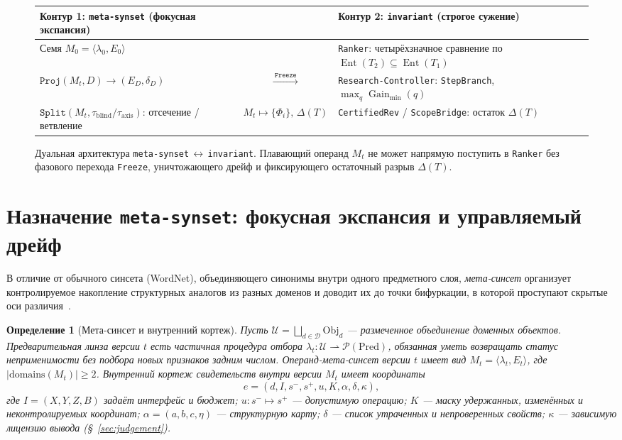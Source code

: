 \documentclass[11pt,a4paper]{article}
\theoremstyle{preprintthm}
\theoremstyle{preprintdef}
\newtheorem{definition}[theorem]{Определение}
\newcommand{\calD}{\mathcal{D}}
\newcommand{\calU}{\mathcal{U}}
\newcommand{\Gain}{\operatorname{Gain}}
\newcommand{\Ent}{\operatorname{Ent}}
\begin{document}
\begin{figure}[!htbp]
\centering
\begingroup\footnotesize
\begin{tabularx}{\linewidth}{@{}XcX@{}}
\toprule
Контур 1: \texttt{meta-synset} (фокусная экспансия) && Контур 2: \texttt{invariant} (строгое сужение)\\
\midrule
Семя $M_0=\langle\lambda_0,E_0\rangle$ && \texttt{Ranker}: четырёхзначное сравнение по $\Ent(T_2)\subseteq\Ent(T_1)$\\
$\texttt{Proj}(M_t,D)\to(E_D,\delta_D)$ &
$\xrightarrow{\ \texttt{Freeze}\ }$ &
\texttt{Research-Controller}: \texttt{StepBranch}, $\max_q\Gain_{\min}(q)$\\
$\texttt{Split}(M_t,\tau_{\mathrm{blind}}/\tau_{\mathrm{axis}})$: отсечение / ветвление &
$M_t\longmapsto\{\Phi_i\},\,\Delta(T)$ &
\texttt{CertifiedRev} / \texttt{ScopeBridge}: остаток $\Delta(T)$\\
\bottomrule
\end{tabularx}
\endgroup
\caption{Дуальная архитектура \texttt{meta-synset}\,$\leftrightarrow$\,\texttt{invariant}. Плавающий операнд $M_t$ не может напрямую поступить в \texttt{Ranker} без фазового перехода \texttt{Freeze}, уничтожающего дрейф и фиксирующего остаточный разрыв $\Delta(T)$.}
\label{fig:dual_loop}
\end{figure}

\section{Назначение \texorpdfstring{\texttt{meta-synset}}{meta-synset}: фокусная экспансия и управляемый дрейф}

В отличие от обычного синсета (WordNet), объединяющего синонимы внутри одного предметного слоя, \emph{мета-синсет} организует контролируемое накопление структурных аналогов из разных доменов и доводит их до точки бифуркации, в которой проступают скрытые оси различия~\cite{strand2026ms2}.

\begin{definition}[Мета-синсет и внутренний кортеж]
Пусть $\calU = \bigsqcup_{d\in\calD}\mathrm{Obj}_d$ --- размеченное объединение доменных объектов. Предварительная линза версии $t$ есть частичная процедура отбора $\lambda_t : \calU \rightharpoonup \mathcal{P}(\mathrm{Pred})$, обязанная уметь возвращать статус неприменимости без подбора новых признаков задним числом. \emph{Операнд-мета-синсет} версии $t$ имеет вид $M_t = \langle \lambda_t, E_t \rangle$, где $|\mathrm{domains}(M_t)| \ge 2$. Внутренний кортеж свидетельств внутри версии $M_t$ имеет координаты
\begin{equation}
  e = (d, I, s^-, s^+, u, K, \alpha, \delta, \kappa),
\end{equation}
где $I=(X,Y,Z,B)$ задаёт интерфейс и бюджет; $u:s^-\mapsto s^+$ --- допустимую операцию; $K$ --- маску удержанных, изменённых и неконтролируемых координат; $\alpha=(a,b,c,\eta)$ --- структурную карту; $\delta$ --- список утраченных и непроверенных свойств; $\kappa$ --- зависимую лицензию вывода (§~\ref{sec:judgement}).
\end{definition}
\end{document}
